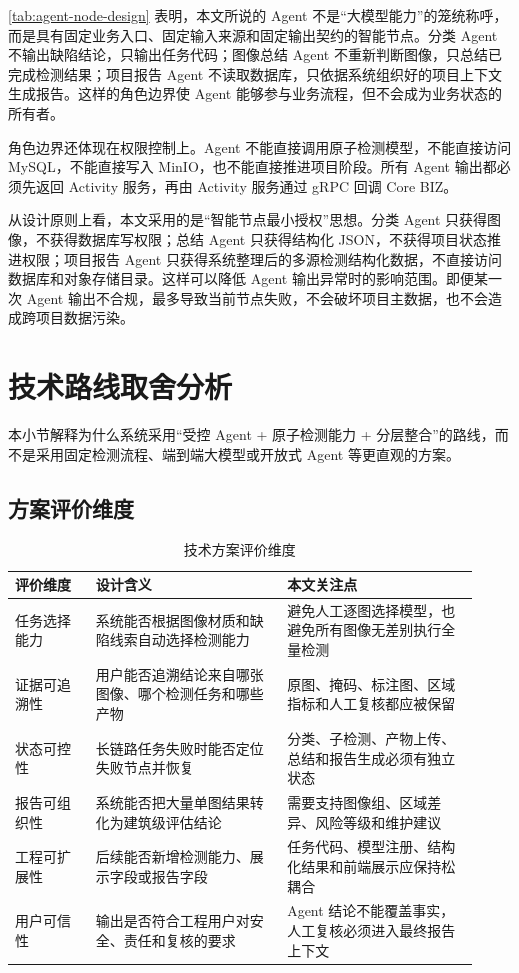 \cref{tab:agent-node-design} 表明，本文所说的 Agent 不是“大模型能力”的笼统称呼，而是具有固定业务入口、固定输入来源和固定输出契约的智能节点。分类 Agent 不输出缺陷结论，只输出任务代码；图像总结 Agent 不重新判断图像，只总结已完成检测结果；项目报告 Agent 不读取数据库，只依据系统组织好的项目上下文生成报告。这样的角色边界使 Agent 能够参与业务流程，但不会成为业务状态的所有者。

角色边界还体现在权限控制上。Agent 不能直接调用原子检测模型，不能直接访问 MySQL，不能直接写入 MinIO，也不能直接推进项目阶段。所有 Agent 输出都必须先返回 Activity 服务，再由 Activity 服务通过 gRPC 回调 Core BIZ。

从设计原则上看，本文采用的是“智能节点最小授权”思想。分类 Agent 只获得图像，不获得数据库写权限；总结 Agent 只获得结构化 JSON，不获得项目状态推进权限；项目报告 Agent 只获得系统整理后的多源检测结构化数据，不直接访问数据库和对象存储目录。这样可以降低 Agent 输出异常时的影响范围。即便某一次 Agent 输出不合规，最多导致当前节点失败，不会破坏项目主数据，也不会造成跨项目数据污染。

\section{技术路线取舍分析}
\label{sec:design-technical-route-tradeoff-analysis}

本小节解释为什么系统采用“受控 Agent + 原子检测能力 + 分层整合”的路线，而不是采用固定检测流程、端到端大模型或开放式 Agent 等更直观的方案。

\subsection{方案评价维度}
\label{subsec:design-scheme-evaluation-dimensions}

\begin{table}[!htb]
  \caption{技术方案评价维度}\label{tab:design-scheme-evaluation-dimensions}
  \centering
  \begin{tabular}{@{}p{0.16\linewidth}p{0.38\linewidth}p{0.38\linewidth}@{}} \toprule
    \textbf{评价维度} & \textbf{设计含义} & \textbf{本文关注点} \\ \midrule
    任务选择能力 & 系统能否根据图像材质和缺陷线索自动选择检测能力 & 避免人工逐图选择模型，也避免所有图像无差别执行全量检测 \\
    证据可追溯性 & 用户能否追溯结论来自哪张图像、哪个检测任务和哪些产物 & 原图、掩码、标注图、区域指标和人工复核都应被保留 \\
    状态可控性 & 长链路任务失败时能否定位失败节点并恢复 & 分类、子检测、产物上传、总结和报告生成必须有独立状态 \\
    报告可组织性 & 系统能否把大量单图结果转化为建筑级评估结论 & 需要支持图像组、区域差异、风险等级和维护建议 \\
    工程可扩展性 & 后续能否新增检测能力、展示字段或报告字段 & 任务代码、模型注册、结构化结果和前端展示应保持松耦合 \\
    用户可信性 & 输出是否符合工程用户对安全、责任和复核的要求 & Agent 结论不能覆盖事实，人工复核必须进入最终报告上下文 \\ \bottomrule
  \end{tabular}
\end{table}

